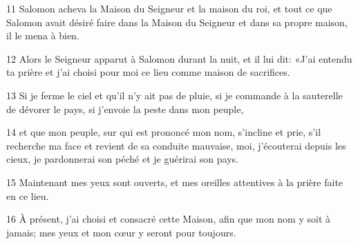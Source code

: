 
11 Salomon acheva la Maison du Seigneur et la maison du roi, et tout ce que Salomon avait désiré faire dans la Maison du Seigneur et dans sa propre maison, il le mena à bien.

12 Alors le Seigneur apparut à Salomon durant la nuit, et il lui dit: «J’ai entendu ta prière et j’ai choisi pour moi ce lieu comme maison de sacrifices.

13 Si je ferme le ciel et qu’il n’y ait pas de pluie, si je commande à la sauterelle de dévorer le pays, si j’envoie la peste dans mon peuple,

14 et que mon peuple, sur qui est prononcé mon nom, s’incline et prie, s’il recherche ma face et revient de sa conduite mauvaise, moi, j’écouterai depuis les cieux, je pardonnerai son péché et je guérirai son pays.

15 Maintenant mes yeux sont ouverts, et mes oreilles attentives à la prière faite en ce lieu.

16 À présent, j’ai choisi et consacré cette Maison, afin que mon nom y soit à jamais; mes yeux et mon cœur y seront pour toujours.